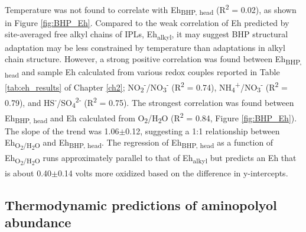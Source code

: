 Temperature was not found to correlate with Eh\textsubscript{BHP, head} (R\textsuperscript{2} = 0.02), as shown in Figure \ref{fig:BHP_Eh}. Compared to the weak correlation of Eh predicted by site-averaged free alkyl chains of IPLs,  Eh\textsubscript{alkyl}, it may suggest BHP structural adaptation may be less constrained by temperature than adaptations in alkyl chain structure. However, a strong positive correlation was found between Eh\textsubscript{BHP, head} and sample Eh calculated from various redox couples reported in Table \ref{tab:eh_results} of Chapter \ref{ch2}; NO\textsubscript{2}\textsuperscript{-}/NO\textsubscript{3}\textsuperscript{-} (R\textsuperscript{2} = 0.74), NH\textsubscript{4}\textsuperscript{+}/NO\textsubscript{3}\textsuperscript{-} (R\textsuperscript{2} = 0.79), and HS\textsuperscript{-}/SO\textsubscript{4}\textsuperscript{2-} (R\textsuperscript{2} = 0.75). The strongest correlation was found between Eh\textsubscript{BHP, head} and Eh calculated from O\textsubscript{2}/H\textsubscript{2}O (R\textsuperscript{2} = 0.84, Figure \ref{fig:BHP_Eh}). The slope of the trend was 1.06$\pm$0.12, suggesting a 1:1 relationship between Eh\textsubscript{O\textsubscript{2}/H\textsubscript{2}O} and Eh\textsubscript{BHP, head}. The regression of Eh\textsubscript{BHP, head} as a function of Eh\textsubscript{O\textsubscript{2}/H\textsubscript{2}O} runs approximately parallel to that of Eh\textsubscript{alkyl} but predicts an Eh that is about 0.40$\pm$0.14 volts more oxidized based on the difference in y-intercepts.

\subsection{Thermodynamic predictions of aminopolyol abundance}


